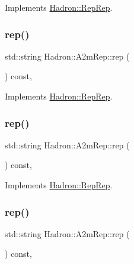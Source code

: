 Implements \mbox{\hyperlink{structHadron_1_1RepRep_ab3213025f6de249f7095892109575fde}{Hadron\+::\+Rep\+Rep}}.

\mbox{\label{structHadron_1_1A2mRep_a1450e109b5a5fcb9a2098c67305fb5af}} 
\subsubsection{\texorpdfstring{rep()}{rep()}\hspace{0.1cm}{\footnotesize\ttfamily [3/5]}}
{\footnotesize\ttfamily std\+::string Hadron\+::\+A2m\+Rep\+::rep (\begin{DoxyParamCaption}{ }\end{DoxyParamCaption}) const\hspace{0.3cm}{\ttfamily [inline]}, {\ttfamily [virtual]}}



Implements \mbox{\hyperlink{structHadron_1_1RepRep_ab3213025f6de249f7095892109575fde}{Hadron\+::\+Rep\+Rep}}.

\mbox{\label{structHadron_1_1A2mRep_a1450e109b5a5fcb9a2098c67305fb5af}} 
\subsubsection{\texorpdfstring{rep()}{rep()}\hspace{0.1cm}{\footnotesize\ttfamily [4/5]}}
{\footnotesize\ttfamily std\+::string Hadron\+::\+A2m\+Rep\+::rep (\begin{DoxyParamCaption}{ }\end{DoxyParamCaption}) const\hspace{0.3cm}{\ttfamily [inline]}, {\ttfamily [virtual]}}



Implements \mbox{\hyperlink{structHadron_1_1RepRep_ab3213025f6de249f7095892109575fde}{Hadron\+::\+Rep\+Rep}}.

\mbox{\label{structHadron_1_1A2mRep_a1450e109b5a5fcb9a2098c67305fb5af}} 
\subsubsection{\texorpdfstring{rep()}{rep()}\hspace{0.1cm}{\footnotesize\ttfamily [5/5]}}
{\footnotesize\ttfamily std\+::string Hadron\+::\+A2m\+Rep\+::rep (\begin{DoxyParamCaption}{ }\end{DoxyParamCaption}) const\hspace{0.3cm}{\ttfamily [inline]}, {\ttfamily [virtual]}}



